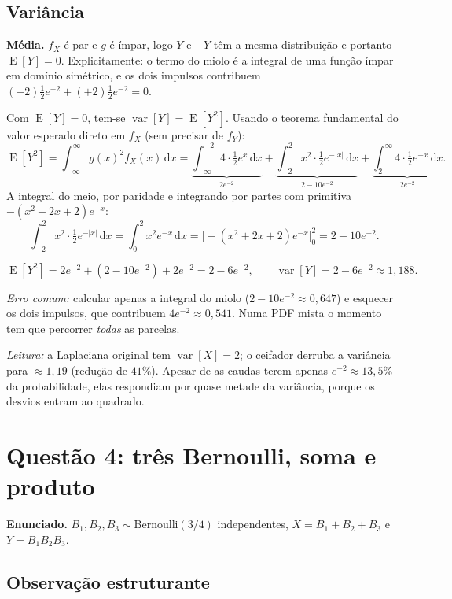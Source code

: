 \documentclass[11pt,a4paper]{article}
\newcommand{\dd}{\,\mathrm{d}}
\DeclareMathOperator{\E}{E}
\DeclareMathOperator{\var}{var}
\begin{document}
\subsection*{Variância}

\textbf{Média.} $f_X$ é par e $g$ é ímpar, logo $Y$ e $-Y$ têm a mesma
distribuição e portanto $\E[Y]=0$. Explicitamente: o termo do miolo é a integral de
uma função ímpar em domínio simétrico, e os dois impulsos contribuem
$(-2)\tfrac12 e^{-2}+(+2)\tfrac12 e^{-2}=0$.

Com $\E[Y]=0$, tem-se $\var[Y]=\E[Y^2]$. Usando o teorema fundamental do valor
esperado direto em $f_X$ (sem precisar de $f_Y$):
\[
\E[Y^2]=\int_{-\infty}^{\infty} g(x)^2 f_X(x)\dd x
=\underbrace{\int_{-\infty}^{-2}\!\!4\cdot\tfrac12 e^{x}\dd x}_{2e^{-2}}
+\underbrace{\int_{-2}^{2}\!x^2\cdot\tfrac12 e^{-|x|}\dd x}_{2-10e^{-2}}
+\underbrace{\int_{2}^{\infty}\!\!4\cdot\tfrac12 e^{-x}\dd x}_{2e^{-2}} .
\]
A integral do meio, por paridade e integrando por partes com primitiva
$-(x^2+2x+2)e^{-x}$:
\[
\int_{-2}^{2}x^2\cdot\tfrac12 e^{-|x|}\dd x=\int_0^2 x^2 e^{-x}\dd x
=\Big[-(x^2+2x+2)e^{-x}\Big]_0^2=2-10e^{-2}.
\]

\begin{resp}
\[
\E[Y^2]=2e^{-2}+\left(2-10e^{-2}\right)+2e^{-2}=2-6e^{-2},
\qquad
\boxed{\var[Y]=2-6e^{-2}\approx 1{,}188 } .
\]
\end{resp}

\emph{Erro comum:} calcular apenas a integral do miolo ($2-10e^{-2}\approx0{,}647$)
e esquecer os dois impulsos, que contribuem $4e^{-2}\approx0{,}541$. Numa PDF mista
o momento tem que percorrer \emph{todas} as parcelas.

\emph{Leitura:} a Laplaciana original tem $\var[X]=2$; o ceifador derruba a
variância para $\approx1{,}19$ (redução de $41\%$). Apesar de as caudas terem
apenas $e^{-2}\approx13{,}5\%$ da probabilidade, elas respondiam por quase metade
da variância, porque os desvios entram ao quadrado.

\clearpage
\section{Questão 4: três Bernoulli, soma e produto}

\textbf{Enunciado.} $B_1,B_2,B_3\sim\text{Bernoulli}(3/4)$ independentes,
$X=B_1+B_2+B_3$ e $Y=B_1B_2B_3$.

\subsection*{Observação estruturante}
\end{document}
